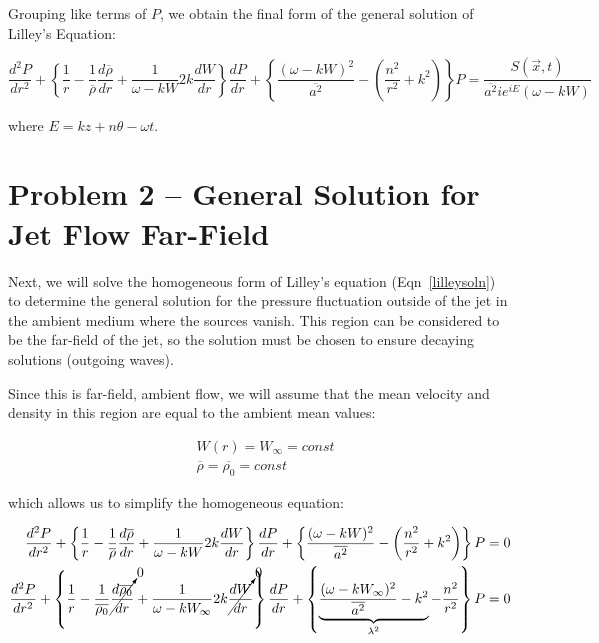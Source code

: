 \documentclass[]{aiaa-tc}%
\begin{document}
Grouping like terms of $P$, we obtain the final form of the general solution of Lilley's Equation:

\begin{equation} \label{lilleysoln}
\boxed{
\dfrac{d^2P}{dr^2}
+ \left\{
    \dfrac{1}{r}
    - \dfrac{1}{\overline{\rho}}\frac{d \overline{\rho}}{dr}
    + \dfrac{1}{\omega - kW} 2k \dfrac{dW}{dr}
\right\} \dfrac{dP}{dr}
+ \left\{
    \dfrac{(\omega - kW)^2}{\overline{a^2}}
    - \left( \dfrac{n^2}{r^2} + k^2 \right)
\right\} P
= \dfrac{S(\vec{x}, t)}{\overline{a^2} ie^{iE} (\omega - kW)} }
\end{equation}

\noindent where $E=kz + n\theta -\omega t$.





\section{Problem 2 -- General Solution for Jet Flow Far-Field} \label{secprob2}

Next, we will solve the homogeneous form of Lilley's equation (Eqn~\ref{lilleysoln}) to determine the general solution for the pressure fluctuation outside of the jet in the ambient medium where the sources vanish.  This region can be considered to be the far-field of the jet, so the solution must be chosen to ensure decaying solutions (outgoing waves).

Since this is far-field, ambient flow, we will assume that the mean velocity and density in this region are equal to the ambient mean values:

\begin{equation}
\begin{split}
&W(r)= W_{\infty}=const \\
&\overline{\rho} = \overline{\rho_0} = const
\end{split}
\end{equation}

\noindent which allows us to simplify the homogeneous equation:

\begin{align*}
\dfrac{d^2P}{dr^2}
+ \left\{
    \dfrac{1}{r}
    - \dfrac{1}{\overline{\rho}}\frac{d \overline{\rho}}{dr}
    + \dfrac{1}{\omega - kW} 2k \dfrac{dW}{dr}
\right\} \dfrac{dP}{dr}
+ \left\{
    \dfrac{(\omega - kW)^2}{\overline{a^2}}
    - \left( \dfrac{n^2}{r^2} + k^2 \right)
\right\} P = 0 \\
\dfrac{d^2P}{dr^2}
  + \left\{
    \dfrac{1}{r}
    - \dfrac{1}{\overline{\rho_0}} \cancelto{0}{\frac{d \overline{\rho_0}}{dr}}
    + \dfrac{1}{\omega - kW_{\infty}} 2k \cancelto{0}{\dfrac{dW}{dr}}
\right\} \dfrac{dP}{dr}
 + \left\{
    \underbrace{ \dfrac{(\omega - k W_{\infty} )^2}{\overline{a^2} }
    - k^2 }_{\lambda^2}
    - \dfrac{n^2}{r^2}
\right\} P = 0
\end{align*}
\end{document}
